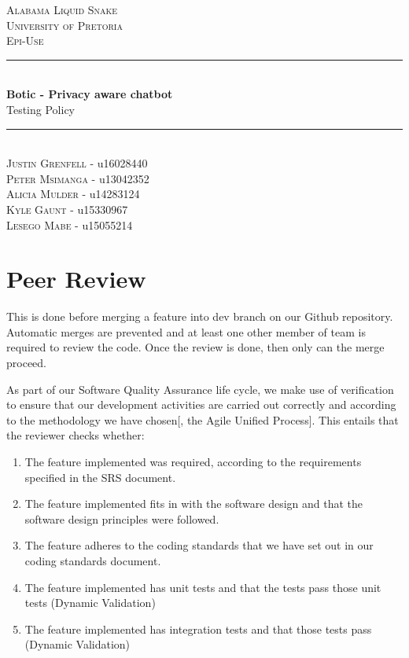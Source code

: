 \documentclass[11pt]{article}
\begin{document}
\renewcommand{\familydefault}{\sfdefault}
\begin{titlepage}
	\newcommand{\HRule}{\rule{\linewidth}{0.5mm}}
	\begin{center}
		            
		\textsc{\LARGE Alabama Liquid Snake}\\[0.8cm]
		\textsc{\Large University of Pretoria}\\[0.5cm]
		\textsc{\large Epi-Use}\\[0.5cm]
		    
		\HRule\\[0.4cm]
		    	
		{\huge\bfseries Botic - Privacy aware chatbot}\\[0.2cm]
		    	
		{\huge Testing Policy}\\[0.2cm]
		
		\HRule\\[0.5cm]
		
		\textsc{Justin Grenfell} - u16028440 \\[0cm]
		\textsc{Peter Msimanga} - u13042352 \\[0cm]
		\textsc{Alicia Mulder} - u14283124 \\[0cm]
		\textsc{Kyle Gaunt} - u15330967 \\[0cm]
		\textsc{Lesego Mabe} - u15055214 \\[0cm]
		    
	\end{center}
\end{titlepage}
\tableofcontents
\newpage
\section{Peer Review}

This is done before merging a feature into dev branch on our Github repository. Automatic merges are prevented and at least one other member of team is required to review the code. Once the review is done, then only can the merge proceed. \par
As part of our Software Quality Assurance life cycle, we make use of verification\cite{Book:1} to ensure that our development activities are carried out correctly and according to the methodology we have chosen[, the Agile Unified Process]. This entails that the reviewer checks whether:
\begin{enumerate}[label=-]
	\item The feature implemented was required, according to the requirements specified in the SRS document.
	\item The feature implemented fits in with the software design and that the software design principles were followed.
	\item The feature adheres to the coding standards that we have set out in our coding standards document.
	\item The feature implemented has unit tests and that the tests pass those unit tests (Dynamic Validation)
	\item The feature implemented has integration tests and that those tests pass (Dynamic Validation)
\end{enumerate}
\par
\end{document}
